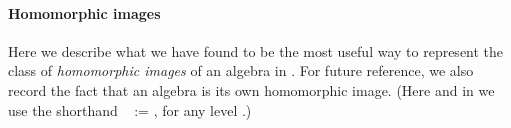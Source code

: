 \paragraph*{Homomorphic images}
Here we describe what we have found to be the most useful
way to represent the class of \emph{homomorphic images} of an algebra in \mltt. For future
reference, we also record the fact that an algebra is its own homomorphic
image. (Here and in \agdaalgebras we use the shorthand ~ := 
   , for any level .)

\ifshort\else
\begin{code}%
\>[0]\<%
\\
\>[0]\AgdaSpace{}%
\AgdaSymbol{:}\AgdaSpace{}%
\AgdaSpace{}%
\AgdaSpace{}%
\<%
\\
\>[0]\AgdaSpace{}%
\AgdaSpace{}%
\AgdaSymbol{=}\AgdaSpace{}%
\AgdaSpace{}%
\AgdaSpace{}%
\AgdaSpace{}%
\AgdaSpace{}%
\AgdaSpace{}%
\<%
\end{code}
\fi

